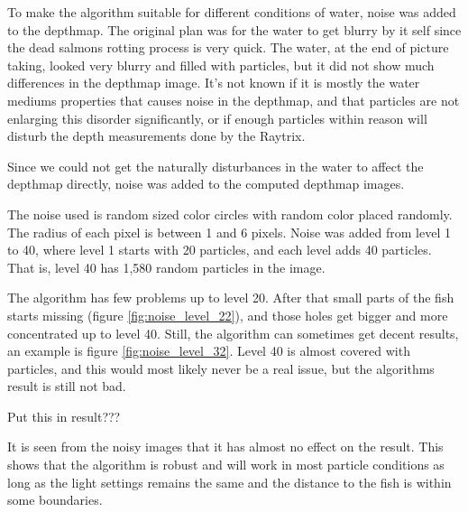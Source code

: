 To make the algorithm suitable for different conditions of water, noise was added to the depthmap.
The original plan was for the water to get blurry by it self since the dead salmons rotting process is very quick. The water, at the end of picture taking, looked very blurry and filled with particles, but it did not show much differences in the depthmap image. It's not known if it is mostly the water mediums properties that causes noise in the depthmap, and that particles are not enlarging this disorder significantly, or if enough particles within reason will disturb the depth measurements done by the Raytrix.

Since we could not get the naturally disturbances in the water to affect the depthmap directly, noise was added to the computed depthmap images.

The noise used is random sized color circles with random color placed randomly. The radius of each pixel is between 1 and 6 pixels. Noise was added from level 1 to 40, where level 1 starts with 20 particles, and each level adds 40 particles. That is, level 40 has 1,580 random particles in the image.

The algorithm has few problems up to level 20. After that small parts of the fish starts missing (figure \ref{fig:noise_level_22}), and those holes get bigger and more concentrated up to level 40. Still, the algorithm can sometimes get decent results, an example is figure \ref{fig:noise_level_32}. Level 40 is almost covered with particles, and this would most likely never be a real issue, but the algorithms result is still not bad. 





{\color{red} Put this in result???

It is seen from the noisy images that it has almost no effect on the result. This shows that the algorithm is robust and will work in most particle conditions as long as the light settings remains the same and the distance to the fish is within some boundaries. }



